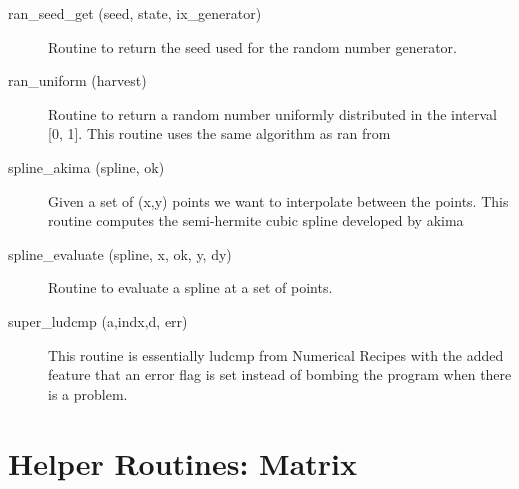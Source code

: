 \begin{description}
\label{r:ran.seed.get}
\item[ran_seed_get (seed, state, ix_generator)] \Newline 
Routine to return the seed used for the random number generator.

\label{r:ran.uniform}
\item[ran_uniform (harvest)] \Newline 
Routine to return a random number uniformly distributed in the 
interval [0, 1]. This routine uses the same algorithm as ran from

\label{r:spline.akima}
\item[spline_akima (spline, ok)] \Newline 
Given a set of (x,y) points we want to interpolate between the points.
This routine computes the semi-hermite cubic spline developed by akima

\label{r:spline.evaluate}
\item[spline_evaluate (spline, x, ok, y, dy)] \Newline 
Routine to evaluate a spline at a set of points.

\label{r:super.ludcmp}
\item[super_ludcmp (a,indx,d, err)] \Newline 
This routine is essentially ludcmp from Numerical Recipes with the added feature
that an error flag is set instead of bombing the program when there is a problem.

\end{description}

\section{Helper Routines: Matrix}
\label{r:helper.matrix}

